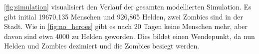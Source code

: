     \autoref{fig:simulation} visualisiert den Verlauf der gesamten modellierten Simulation. Es gibt initial 19670,135 Menschen und 926,865 Helden, zwei Zombies sind in der Stadt. Wie in \autoref{fig:no_heroes} gibt es nach 20 Tagen keine Menschen mehr, aber davon sind etwa 4000 zu Helden geworden. Dies bildet einen Wendepunkt, da nun Helden und Zombies dezimiert und die Zombies besiegt werden.
